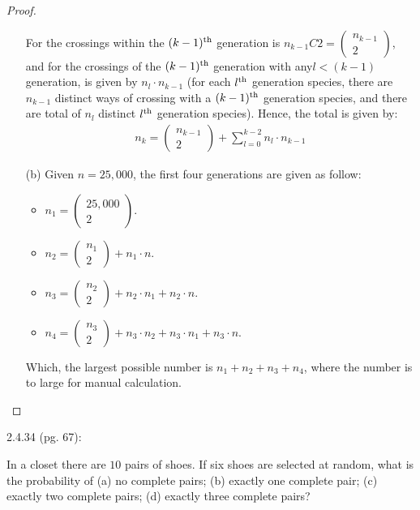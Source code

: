 \documentclass{article}
\begin{document}
\begin{proof}
\begin{itemize}
        For the crossings within the $(k-1)^\textmd{th}$ generation is $n_{k-1}C2 = \begin{pmatrix}n_{k-1}\\2\end{pmatrix}$, and for the crossings of the $(k-1)^\textmd{th}$ generation with any$l<(k-1)$ generation, is given by $n_l\cdot n_{k-1}$ (for each $l^\textmd{th}$ generation species, there are $n_{k-1}$ distinct ways of crossing with a $(k-1)^\textmd{th}$ generation species, and there are total of $n_l$ distinct $l^\textmd{th}$ generation species). Hence, the total is given by:
        \begin{align}
            n_k=\begin{pmatrix}n_{k-1}\\2\end{pmatrix} + \sum_{l=0}^{k-2}n_l\cdot n_{k-1}
        \end{align}
        \item[(b)] Given $n=25,000$, the first four generations are given as follow:
        \begin{itemize}
            \item $n_1=\begin{pmatrix}25,000\\2\end{pmatrix}$.
            \item $n_2= \begin{pmatrix}n_1\\2\end{pmatrix}+ n_1 \cdot n$.
            \item $n_3 = \begin{pmatrix}n_2\\2\end{pmatrix} + n_2\cdot n_1+n_2\cdot n$.
            \item $n_4 = \begin{pmatrix}n_3\\2\end{pmatrix} + n_3\cdot n_2+n_3\cdot n_1+n_3\cdot n$.
        \end{itemize}
        Which, the largest possible number is $n_1+n_2+n_3+n_4$, where the number is to large for manual calculation.
    \end{itemize}
\end{proof}

\hfil

\begin{ques}\label{q5}
    2.4.34 (pg. 67):

    In a closet there are $10$ pairs of shoes. If six shoes are selected at random, what is the probability of (a) no complete pairs; (b) exactly one complete pair; (c) exactly two complete pairs; (d) exactly three complete pairs?
\end{ques}
\end{document}
